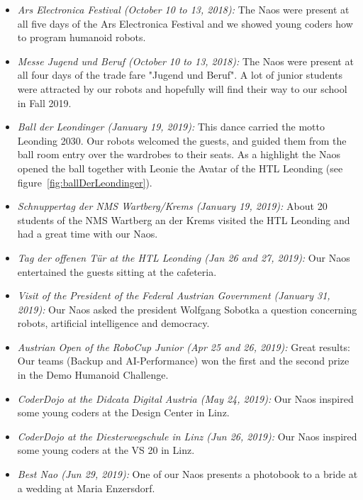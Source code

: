 \documentclass[11pt]{article}
\begin{document}
\begin{itemize}
	\item {\em Ars Electronica Festival (October 10 to 13, 2018):} The Naos were present at all five days of the Ars Electronica Festival and we showed young coders how to program humanoid robots.
	
	\item {\em Messe Jugend und Beruf (October 10 to 13, 2018):}  The Naos were present at all four days of the trade fare "Jugend und Beruf". A lot of junior students were attracted by our robots and hopefully will find their way to our school in Fall 2019.
	
	\item  {\em Ball der Leondinger (January 19, 2019):}  This dance carried the motto Leonding 2030. Our robots welcomed the guests, and guided them from the ball room entry over the wardrobes to their seats. As a highlight the Naos opened the ball together with Leonie the Avatar of the HTL Leonding (see figure~\ref{fig:ballDerLeondinger}).

	\item  {\em Schnuppertag der NMS Wartberg/Krems (January 19, 2019):}  About 20 students of the NMS Wartberg an der Krems visited the HTL Leonding and had a great time with our Naos.

	\item {\em Tag der offenen Tür at the HTL Leonding (Jan 26 and 27, 2019):}  Our Naos entertained the guests sitting at the cafeteria.
	
	\item  {\em Visit of the President of the Federal Austrian Government (January 31, 2019):}  Our Naos asked the president Wolfgang Sobotka a question concerning robots, artificial intelligence and democracy.
	
	\item {\em Austrian Open of the RoboCup Junior (Apr 25 and 26, 2019):}  Great results: Our teams (Backup and AI-Performance) won the first and the second prize in the Demo Humanoid Challenge.

	\item  {\em CoderDojo at the Didcata Digital Austria (May 24, 2019):}  Our Naos inspired some young coders at the Design Center in Linz.

	\item  {\em CoderDojo at the Diesterwegschule in Linz (Jun 26, 2019):}  Our Naos inspired some young coders at the VS 20 in Linz.

	\item  {\em Best Nao (Jun 29, 2019):}  One of our Naos presents a photobook to a bride at a wedding at Maria Enzersdorf.


\end{itemize}
\end{document}
